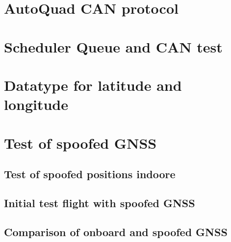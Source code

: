 \section{AutoQuad CAN protocol} \label{app:aq_can_protocol}



%


\section{Scheduler Queue and CAN test} \label{app:scheduler_and_can_test}


\section{Datatype for latitude and longitude}


\section{Test of spoofed GNSS} \label{app:test_of_spoofed_GNSS}


\subsection{Test of spoofed positions indoore}
\label{app:test_of_spoofed_positions_indoore}



\subsection{Initial test flight with spoofed GNSS}
\label{app:test_of_spoofed_positions_outdoore}


\subsection{Comparison of onboard and spoofed GNSS}
\label{app:Comparesion_of_onboard_and_spoofed_GNSS}



